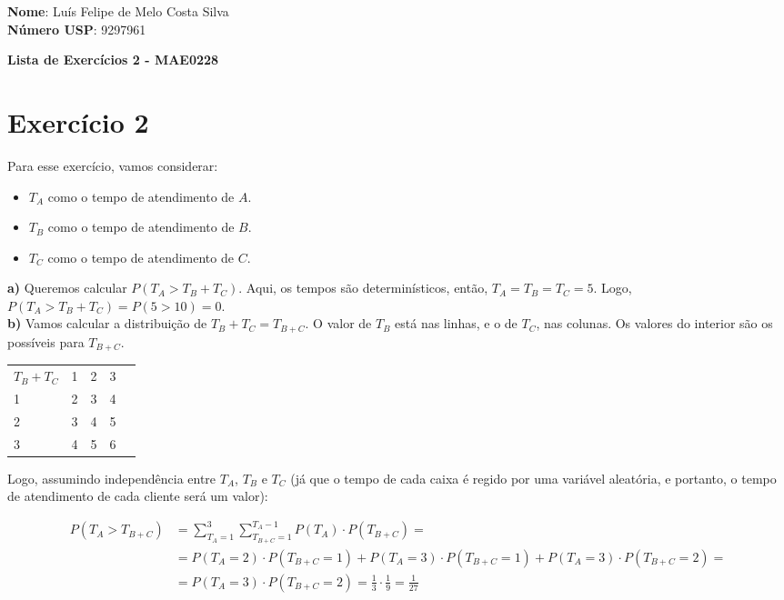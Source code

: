 \documentclass[12pt,letterpaper]{article}
\begin{document}
	
	\textbf{Nome}: Luís Felipe de Melo Costa Silva \\
	\textbf{Número USP}: 9297961 
	
	\begin{center}
		\LARGE \bf
		Lista de Exercícios 2 - MAE0228
	\end{center}
	
	\section*{Exercício 2}
	
	Para esse exercício, vamos considerar:
	
	\begin{itemize}
		\item $T_A$ como o tempo de atendimento de $A$.
		\item $T_B$ como o tempo de atendimento de $B$.
		\item $T_C$ como o tempo de atendimento de $C$.
	\end{itemize}
	
	\textbf{a)} Queremos calcular $P(T_A > T_B + T_C)$. Aqui, os tempos são determinísticos, então, $T_A = T_B = T_C = 5$. Logo, $P(T_A > T_B + T_C) = P(5 > 10) = 0$. \\
	
	\textbf{b)} Vamos calcular a distribuição de $T_B+T_C = T_{B+C}$. O valor de $T_B$ está nas linhas, e o de $T_C$, nas colunas. Os valores do interior são os possíveis para $T_{B+C}$.
	
	\begin{center}
		\begin{tabular}{|l|l|l|l|l}
			\cline{1-4}
			$T_B+T_C$ & 1 & 2 & 3 &  \\ \cline{1-4}
			1         & 2 & 3 & 4 &  \\ \cline{1-4}
			2         & 3 & 4 & 5 &  \\ \cline{1-4}
			3         & 4 & 5 & 6 &  \\ \cline{1-4}
		\end{tabular}
	\end{center}
	
	Logo, assumindo independência entre $T_A$, $T_B$ e $T_C$ (já que o tempo de cada caixa é regido por uma variável aleatória, e portanto, o tempo de atendimento de cada cliente será um valor):
	
	\begin{equation*}
		\begin{split}
			P(T_A > T_{B+C}) & = \sum_{T_A = 1}^{3} \sum_{T_{B+C} = 1}^{T_A-1} P(T_A) \cdot P(T_{B+C}) = \\
			& = P(T_A = 2) \cdot P(T_{B+C} = 1) + P(T_A = 3) \cdot P(T_{B+C} = 1) + P(T_A = 3) \cdot P(T_{B+C} = 2) = \\
			& = P(T_A = 3) \cdot P(T_{B+C} = 2) = \frac{1}{3} \cdot \frac{1}{9} = \frac{1}{27}
		\end{split}
	\end{equation*}
	
\end{document}
